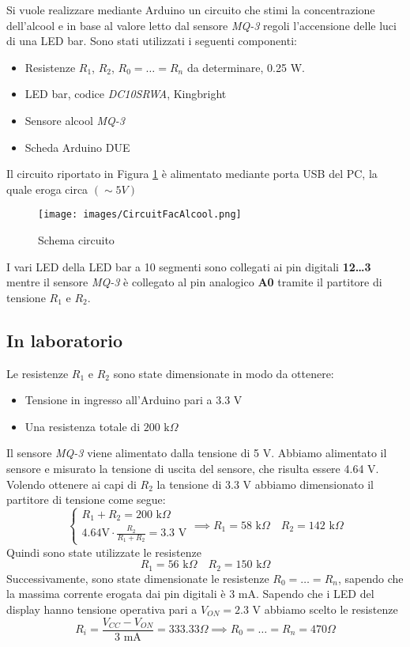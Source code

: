 Si vuole realizzare mediante Arduino un circuito che stimi la concentrazione dell’alcool e in base al valore letto dal sensore \textit{MQ-3} regoli l’accensione delle luci di una LED bar. Sono stati utilizzati i seguenti componenti:
\begin{itemize}
    \item Resistenze $R_1$, $R_2$, $R_0=\dots=R_n$ da determinare, 0.25 W.
    \item LED bar,  codice \textit{DC10SRWA}, Kingbright 
    \item Sensore alcool \textit{MQ-3}
    \item Scheda Arduino DUE
\end{itemize}
Il circuito riportato in Figura \ref{fig:CircuitFacAlcool} è alimentato mediante porta USB del PC, la quale eroga circa $(\sim 5 V)$
\begin{figure}[H]
    \centering
    \texttt{[image: images/CircuitFacAlcool.png]}
    \caption{Schema circuito}
    \label{fig:CircuitFacAlcool}
\end{figure}
I vari LED della LED bar a 10 segmenti sono collegati ai pin digitali \textbf{12\dots3} mentre il sensore \textit{MQ-3} è collegato al pin analogico \textbf{A0} tramite il partitore di tensione $R_1$ e $R_2$.
\subsection{In laboratorio}
Le resistenze $R_1$ e $R_2$ sono state dimensionate in modo da ottenere:
\begin{itemize}
    \item Tensione in ingresso all’Arduino pari a $3.3\text{ V}$ 
    \item Una resistenza totale di $200\text{ k}\Omega$
\end{itemize}
Il sensore \textit{MQ-3} viene alimentato dalla tensione di 5 V. Abbiamo alimentato il sensore e misurato la tensione di uscita del sensore, che risulta essere 4.64 V. Volendo ottenere ai capi di $R_2$ la tensione di 3.3 V abbiamo dimensionato il partitore di tensione come segue:
\begin{equation}
    \begin{cases}
        R_1+R_2=200\text{ k}\Omega\\
        4.64\text{V}\cdot\frac{R_2}{R_1+R_2}=3.3\text{ V}
    \end{cases}
    \implies R_1=58\text{ k}\Omega\quad R_2=142\text{ k}\Omega
\end{equation}
Quindi sono state utilizzate le resistenze
\begin{equation*}
    R_1 = 56 \text{ k} \Omega\quad R_2 = 150 \text{ k} \Omega
\end{equation*}
Successivamente, sono state dimensionate le resistenze $R_0=\dots=R_n$, sapendo che la massima corrente erogata dai pin digitali è $3\text{ mA}$. Sapendo che i LED del display hanno tensione operativa pari a $V_{ON}=2.3\text{ V}$ abbiamo scelto le resistenze
\begin{equation*}
    R_i=\frac{V_{CC}-V_{ON}}{3\text{ mA}}=333.33\Omega\implies R_0=\dots=R_n = 470\Omega
\end{equation*}

